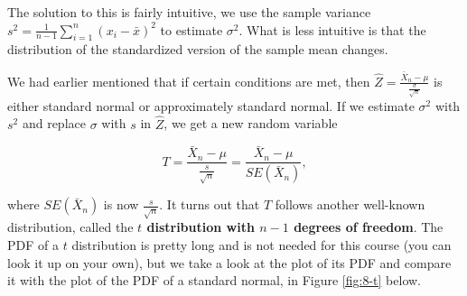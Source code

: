 \documentclass[
]{book}
\begin{document}
The solution to this is fairly intuitive, we use the sample variance \(s^2 = \frac{1}{n-1} \sum_{i=1}^n (x_i - \bar{x})^2\) to estimate \(\sigma^2\). What is less intuitive is that the distribution of the standardized version of the sample mean changes.

We had earlier mentioned that if certain conditions are met, then \(\hat{Z} = \frac{\bar{X}_n - \mu}{\frac{\sigma}{\sqrt{n}}}\) is either standard normal or approximately standard normal. If we estimate \(\sigma^2\) with \(s^2\) and replace \(\sigma\) with \(s\) in \(\hat{Z}\), we get a new random variable

\begin{equation} 
T =  \frac{\bar{X}_n - \mu}{\frac{s}{\sqrt{n}}} = \frac{\bar{X}_n - \mu}{SE(\bar{X}_n)},
\label{eq:8-tstat}
\end{equation}

where \(SE(\bar{X}_n)\) is now \(\frac{s}{\sqrt{n}}\). It turns out that \(T\) follows another well-known distribution, called the \textbf{\(t\) distribution with \(n-1\) degrees of freedom}. The PDF of a \(t\) distribution is pretty long and is not needed for this course (you can look it up on your own), but we take a look at the plot of its PDF and compare it with the plot of the PDF of a standard normal, in Figure \ref{fig:8-t} below.
\end{document}
